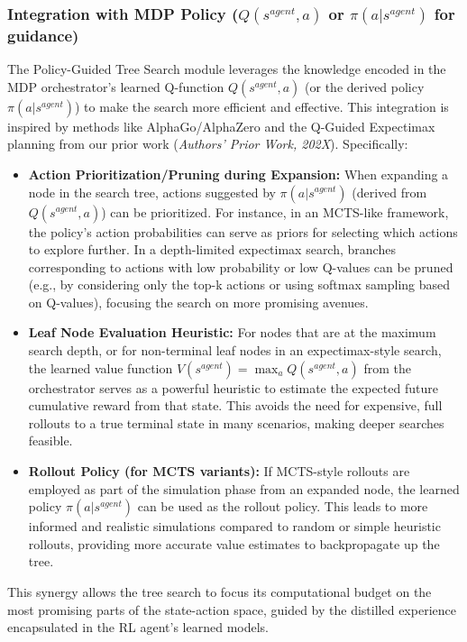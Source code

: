\documentclass[11pt]{article}
\begin{document}
\subsubsection{Integration with MDP Policy ($Q(s^{agent},a)$ or $\pi(a|s^{agent})$ for guidance)}
\label{sssec:tree_search_integration}
The Policy-Guided Tree Search module leverages the knowledge encoded in the MDP orchestrator's learned Q-function $Q(s^{agent},a)$ (or the derived policy $\pi(a|s^{agent})$) to make the search more efficient and effective. This integration is inspired by methods like AlphaGo/AlphaZero \citep{Silver2016MasteringTG, Silver2017MasteringC} and the Q-Guided Expectimax planning from our prior work (\textit{Authors' Prior Work, 202X}). Specifically:
\begin{itemize}
    \item \textbf{Action Prioritization/Pruning during Expansion:} When expanding a node in the search tree, actions suggested by $\pi(a|s^{agent})$ (derived from $Q(s^{agent},a)$) can be prioritized. For instance, in an MCTS-like framework, the policy's action probabilities can serve as priors for selecting which actions to explore further. In a depth-limited expectimax search, branches corresponding to actions with low probability or low Q-values can be pruned (e.g., by considering only the top-k actions or using softmax sampling based on Q-values), focusing the search on more promising avenues.
    \item \textbf{Leaf Node Evaluation Heuristic:} For nodes that are at the maximum search depth, or for non-terminal leaf nodes in an expectimax-style search, the learned value function $V(s^{agent}) = \max_a Q(s^{agent},a)$ from the orchestrator serves as a powerful heuristic to estimate the expected future cumulative reward from that state. This avoids the need for expensive, full rollouts to a true terminal state in many scenarios, making deeper searches feasible.
    \item \textbf{Rollout Policy (for MCTS variants):} If MCTS-style rollouts are employed as part of the simulation phase from an expanded node, the learned policy $\pi(a|s^{agent})$ can be used as the rollout policy. This leads to more informed and realistic simulations compared to random or simple heuristic rollouts, providing more accurate value estimates to backpropagate up the tree.
\end{itemize}
This synergy allows the tree search to focus its computational budget on the most promising parts of the state-action space, guided by the distilled experience encapsulated in the RL agent's learned models.
\end{document}
